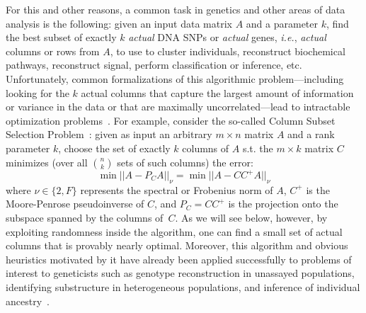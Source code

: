 \documentclass[twoside]{article}
\begin{document}
For this and other reasons, a common task in genetics and other areas of data 
analysis is the following: given an input data matrix $A$ and a parameter 
$k$, find the best subset of exactly $k$ \emph{actual} DNA SNPs or 
\emph{actual} genes, \emph{i.e.}, \emph{actual} columns or rows from $A$, to 
use to cluster individuals, reconstruct biochemical pathways, reconstruct 
signal, perform classification or inference, etc.
Unfortunately, common formalizations of this algorithmic problem---including 
looking for the $k$ actual columns that capture the largest amount of 
information or variance in the data or that are maximally 
uncorrelated---lead to intractable optimization 
problems~\cite{CM08,CM09a}.
For example, consider the so-called Column Subset Selection Problem~\cite{BMD09_CSSP_SODA}:
given as input an arbitrary $m \times n$ matrix $A$ and a rank parameter 
$k$, choose the set of exactly $k$ columns of $A$ s.t. the $m \times k$ 
matrix $C$ minimizes (over all ${n \choose k}$ sets of such columns) the error:
\begin{equation}
\min ||A-P_CA||_{\nu} = \min ||A-CC^+A||_{\nu}  
\label{eqn:error-measure}
\end{equation}
where  $\nu\in\{2,F\}$ represents the spectral or Frobenius norm
of $A$, $C^+$ is the Moore-Penrose pseudoinverse of $C$, and $P_C=CC^+$ is the projection onto the subspace spanned by 
the columns of~$C$.
As we will see below, however, by exploiting randomness inside the 
algorithm, one can find a small set of actual columns that is provably 
nearly optimal.
Moreover, this algorithm and obvious heuristics motivated by it have already 
been applied successfully to problems of interest to geneticists such as 
genotype reconstruction in unassayed populations, identifying substructure 
in heterogeneous populations, and inference of individual 
ancestry~\cite{CUR_PNAS,Paschou07a,Paschou07b,Paschou08a,Paschou10a,Paschou10b,Paschou11a}.
\end{document}
